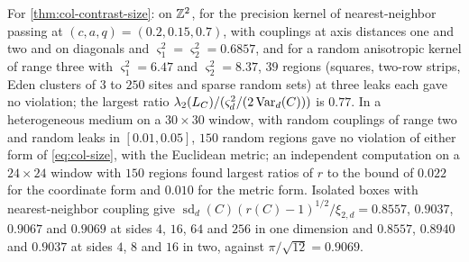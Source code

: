 \begin{numcheck}\label{chk:col-size}
For \cref{thm:col-contrast-size}: on $\mathbb{Z}^2$, for the precision kernel of nearest-neighbor passing at $(c,a,q)=(0.2,0.15,0.7)$, with couplings at axis distances one and two and on diagonals and $\varsigma_1^2=\varsigma_2^2=0.6857$, and for a random anisotropic kernel of range three with $\varsigma_1^2=6.47$ and $\varsigma_2^2=8.37$, $39$ regions (squares, two-row strips, Eden clusters of $3$ to $250$ sites and sparse random sets) at three leaks each gave no violation; the largest ratio $\lambda_2(L_C)/(\varsigma_d^2/(2\operatorname{Var}_d(C)))$ is $0.77$. In a heterogeneous medium on a $30\times30$ window, with random couplings of range two and random leaks in $[0.01,0.05]$, $150$ random regions gave no violation of either form of \eqref{eq:col-size}, with the Euclidean metric; an independent computation on a $24\times24$ window with $150$ regions found largest ratios of $r$ to the bound of $0.022$ for the coordinate form and $0.010$ for the metric form. Isolated boxes with nearest-neighbor coupling give $\operatorname{sd}_d(C)(r(C)-1)^{1/2}/\xi_{2,d}=0.8557$, $0.9037$, $0.9067$ and $0.9069$ at sides $4$, $16$, $64$ and $256$ in one dimension and $0.8557$, $0.8940$ and $0.9037$ at sides $4$, $8$ and $16$ in two, against $\pi/\sqrt{12}=0.9069$.
\end{numcheck}

